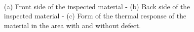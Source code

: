 \graphicspath{ {./Figure/Figure7/} }
\begin{figure}
  \centering
	
  \hspace*{\fill}
   \hfill
  \hspace*{\fill} \\ \hspace*{\fill}
  \hspace*{\fill}
	
	  \caption{(a) Front side of the inspected material - (b) Back side of the inspected
		material - (c) Form of the thermal response of the material in the area with and without
		defect.}
		\label{fig:44}
		\end{figure}
